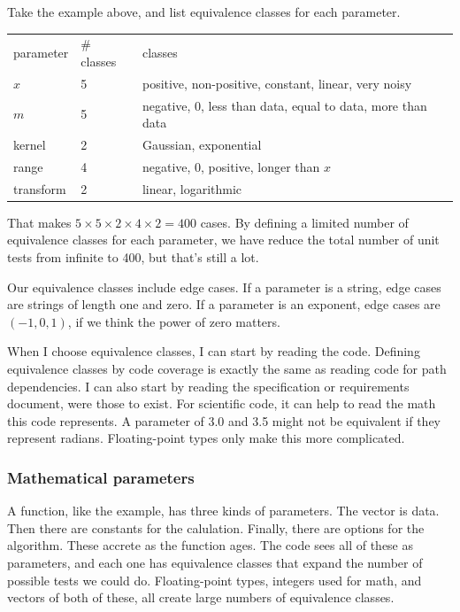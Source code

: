 \documentclass[fleqn,10pt]{olplainarticle}
\begin{document}
Take the example above, and list equivalence classes for each parameter.
\begin{center}
\begin{tabular}{|l|l|l|}\hline
parameter & \# classes & classes \\
$x$ & 5 & positive, non-positive, constant, linear, very noisy \\
$m$ & 5 & negative, 0, less than data, equal to data, more than data \\
kernel & 2 & Gaussian, exponential \\
range & 4 & negative, 0, positive, longer than $x$ \\
transform & 2 & linear, logarithmic \\ \hline
\end{tabular}
\end{center}
That makes $5\times 5 \times 2 \times 4\times 2 = 400$ cases.
By defining a limited number of equivalence classes for
each parameter, we have reduce the total number of unit tests
from infinite to 400, but that's still a lot.

Our equivalence classes include edge cases. If a parameter
is a string, edge cases are strings of length one and zero.
If a parameter is an exponent, edge cases are $(-1, 0, 1)$,
if we think the power of zero matters.

When I choose equivalence classes, I can start by reading
the code. Defining equivalence classes by code coverage is
exactly the same as reading code for path dependencies.
I can also start by reading the specification or requirements
document, were those to exist. For scientific code,
it can help to read the math this code represents.
A parameter of 3.0 and 3.5 might not be equivalent if they
represent radians. Floating-point types only make this
more complicated.

\subsubsection{Mathematical parameters}

A function, like the example, has three kinds of parameters.
The vector is data. Then there are constants for the calulation.
Finally, there are options for the algorithm. These accrete
as the function ages. The code sees all of these as parameters,
and each one has equivalence classes that expand the
number of possible tests we could do.
Floating-point types, integers used for math, and vectors
of both of these, all create large numbers of equivalence classes.
\end{document}
